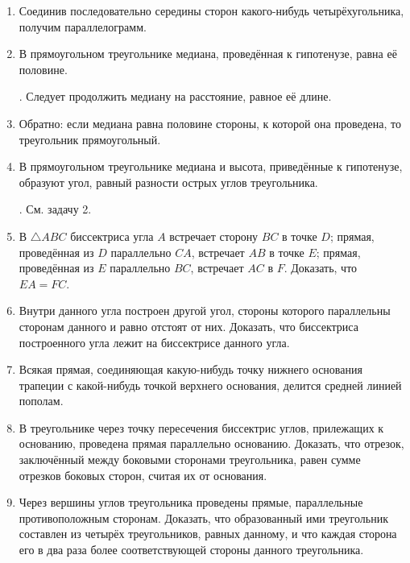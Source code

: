 \documentclass[twoside]{book}
\begin{document}
\begin{center}
\end{center}

\begin{enumerate}

 \item
Соединив последовательно середины сторон какого-нибудь четырёхугольника, получим параллелограмм.

 \item
В прямоугольном треугольнике медиана, проведённая к гипотенузе, равна её половине.

\smallskip
{}.
Следует продолжить медиану на расстояние, равное её длине.

 \item
Обратно:
если медиана равна половине стороны, к которой она проведена, то треугольник прямоугольный.

 \item
В прямоугольном треугольнике медиана и высота, приведённые к гипотенузе, образуют угол, равный разности острых углов треугольника.

\smallskip
{}.
См.
задачу 2.

 \item
В $\triangle ABC$ биссектриса угла $A$ встречает сторону $BC$ в точке $D$;
прямая, проведённая из $D$ параллельно $CA$, встречает $AB$ в точке $E$;
прямая, проведённая из $E$ параллельно $BC$, встречает $AC$ в $F$.
Доказать, что $EA=FC$.

 \item
Внутри данного угла построен другой угол, стороны которого параллельны сторонам данного и равно отстоят от них.
Доказать, что биссектриса построенного угла лежит на биссектрисе данного угла.

 \item
Всякая прямая, соединяющая какую-нибудь точку нижнего основания трапеции с какой-нибудь точкой верхнего основания, делится средней линией пополам.

 \item
В треугольнике через точку пересечения биссектрис углов, прилежащих к основанию, проведена прямая параллельно основанию.
Доказать, что отрезок, заключённый между боковыми сторонами треугольника, равен сумме отрезков боковых сторон, считая их от основания.

 \item
Через вершины углов треугольника проведены прямые, параллельные противоположным сторонам.
Доказать, что образованный ими треугольник составлен из четырёх треугольников, равных данному, и что каждая сторона его в два раза более соответствующей стороны данного треугольника.


\end{enumerate}
\end{document}
